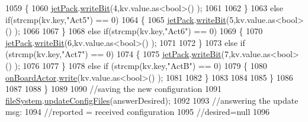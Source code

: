 \begin{DoxyCode}
1059                     \{
1060                         \hyperlink{class_cool_board_a30b1357881b01ccbec676856a91e48e9}{jetPack}.\hyperlink{class_jetpack_a79ae7bc3c1828a0551a7c005c4f8bd00}{writeBit}(4,kv.value.as<\textcolor{keywordtype}{bool}>() ); 
1061 
1062                     \}
1063                     \textcolor{keywordflow}{else} \textcolor{keywordflow}{if}(strcmp(kv.key,\textcolor{stringliteral}{"Act5"}) == 0)
1064                     \{
1065                         \hyperlink{class_cool_board_a30b1357881b01ccbec676856a91e48e9}{jetPack}.\hyperlink{class_jetpack_a79ae7bc3c1828a0551a7c005c4f8bd00}{writeBit}(5,kv.value.as<\textcolor{keywordtype}{bool}>() ); 
1066 
1067                     \}
1068                     \textcolor{keywordflow}{else} \textcolor{keywordflow}{if}(strcmp(kv.key,\textcolor{stringliteral}{"Act6"}) == 0)
1069                     \{
1070                         \hyperlink{class_cool_board_a30b1357881b01ccbec676856a91e48e9}{jetPack}.\hyperlink{class_jetpack_a79ae7bc3c1828a0551a7c005c4f8bd00}{writeBit}(6,kv.value.as<\textcolor{keywordtype}{bool}>() ); 
1071 
1072                     \}
1073                     \textcolor{keywordflow}{else} \textcolor{keywordflow}{if} (strcmp(kv.key,\textcolor{stringliteral}{"Act7"}) == 0)
1074                     \{
1075                         \hyperlink{class_cool_board_a30b1357881b01ccbec676856a91e48e9}{jetPack}.\hyperlink{class_jetpack_a79ae7bc3c1828a0551a7c005c4f8bd00}{writeBit}(7,kv.value.as<\textcolor{keywordtype}{bool}>() ); 
1076 
1077                     \}
1078                     \textcolor{keywordflow}{else} \textcolor{keywordflow}{if} (strcmp(kv.key,\textcolor{stringliteral}{"ActB"}) == 0)
1079                     \{
1080                         \hyperlink{class_cool_board_a4ac693895c21025b8808653f2a4316e6}{onBoardActor}.\hyperlink{class_cool_board_actor_a958786ff01ea1056ee72c72d439f86da}{write}(kv.value.as<\textcolor{keywordtype}{bool}>() ); 
1081 
1082                     \}
1083                                 
1084                 
1085                 \}
1086 
1087                 
1088             \}
1089 
1090             \textcolor{comment}{//saving the new configuration}
1091             \hyperlink{class_cool_board_a42c2586fbb13ff7f06538e9284e8538d}{fileSystem}.\hyperlink{class_cool_file_system_adfa8e2e80641ae6f0cceabd348a9b841}{updateConfigFiles}(answerDesired);
1092 
1093                 \textcolor{comment}{//answering the update msg:}
1094             \textcolor{comment}{//reported = received configuration}
1095             \textcolor{comment}{//desired=null}
1096         

\end{DoxyCode}
